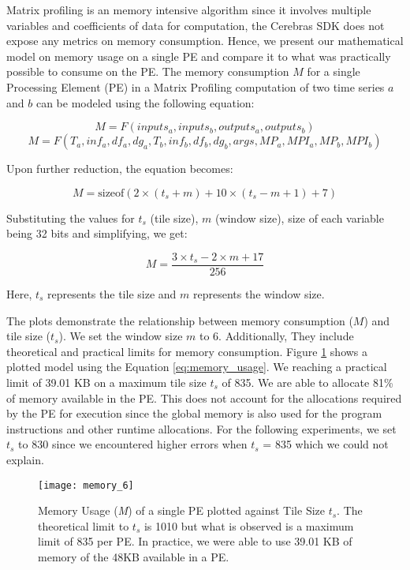 Matrix profiling is an memory intensive algorithm since it involves multiple variables and coefficients of data for computation, the Cerebras SDK does not expose any metrics on memory consumption. Hence, we present our mathematical model on memory usage on a single PE and compare it to what was practically possible to consume on the PE. The memory consumption $M$ for a single Processing Element (PE) in a Matrix Profiling computation of two time series $a$ and $b$ can be modeled using the following equation:


\[
M = F(inputs_a, inputs_b, outputs_a, outputs_b)
\]
\[ 
M = F(T_a, inf_a, df_a, dg_a, T_b, inf_b, df_b, dg_b, args, MP_a, MPI_a, MP_b, MPI_b)
\]

Upon further reduction, the equation becomes:

\[
M = \text{sizeof}(2 \times (t_s + m) + 10 \times (t_s - m + 1) + 7)
\]

Substituting the values for $t_s$ (tile size), $m$ (window size), size of each variable being 32 bits and simplifying, we get:

\begin{equation} \label{eq:memory_usage}
M = \frac{3 \times t_s - 2 \times m + 17}{256}
\end{equation}

Here, $t_s$ represents the tile size and $m$ represents the window size.

The plots demonstrate the relationship between memory consumption ($M$) and tile size ($t_s$). We set the window size $m$ to 6. Additionally, They include theoretical and practical limits for memory consumption. Figure \ref{fig:mem_usage} shows a plotted model using the Equation \ref{eq:memory_usage}. We reaching a practical limit of 39.01 KB on a maximum tile size $t_s$ of 835. We are able to allocate 81\% of memory available in the PE. This does not account for the allocations required by the PE for execution since the global memory is also used for the program instructions and other runtime allocations. For the following experiments, we set $t_s$ to 830 since we encountered higher errors when $t_s$ = 835 which we could not explain.

\begin{figure}[h!]
    \texttt{[image: memory\_6]}
    \centering
    \caption{Memory Usage (\textit{M}) of a single PE plotted against Tile Size $t_s$. The theoretical limit to $t_s$ is 1010 but what is observed is a maximum limit of 835 per PE. In practice, we were able to use 39.01 KB of memory of the 48KB available in a PE.}
    \label{fig:mem_usage}
\end{figure}


